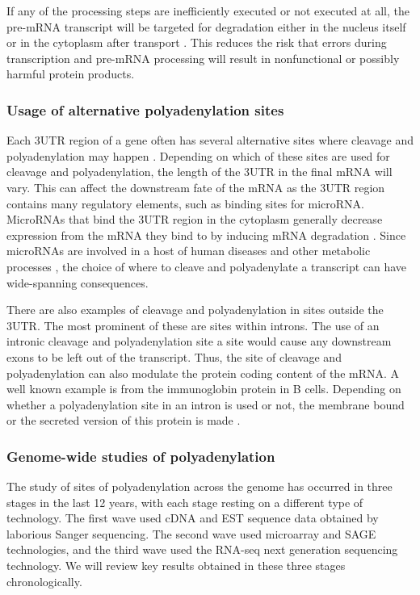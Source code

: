 If any of the processing steps are inefficiently executed or not executed at
all, the pre-mRNA transcript will be targeted for degradation either in the
nucleus itself or in the cytoplasm after transport \cite{doma_rna_2007}. This
reduces the risk that errors during transcription and pre-mRNA processing will
result in nonfunctional or possibly harmful protein products.

\subsubsection{Usage of alternative polyadenylation sites}
Each 3\p UTR region of a gene often has several alternative sites where
cleavage and polyadenylation may happen \cite{tian_large-scale_2005}. Depending
on which of these sites are used for cleavage and polyadenylation, the length
of the 3\p UTR in the final mRNA will vary. This can affect the downstream fate
of the mRNA as the 3\p UTR region contains many regulatory elements, such as
binding sites for microRNA. MicroRNAs that bind the 3\p UTR region in the
cytoplasm generally decrease expression from the mRNA they bind to by inducing
mRNA degradation \cite{huntzinger_gene_2011}. Since microRNAs are involved in a
host of human diseases and other metabolic processes
\cite{huang_biological_2010}, the choice of where to cleave and polyadenylate a
transcript can have wide-spanning consequences.

There are also examples of cleavage and polyadenylation in sites outside the
3\p UTR. The most prominent of these are sites within introns. The use of an
intronic cleavage and polyadenylation site a site would cause any downstream
exons to be left out of the transcript. Thus, the site of cleavage and
polyadenylation can also modulate the protein coding content of the mRNA. A
well known example is from the immunoglobin protein in B cells. Depending on
whether a polyadenylation site in an intron is used or not, the membrane bound
or the secreted version of this protein is made \cite{peterson_regulated_1989}.

\subsubsection{Genome-wide studies of polyadenylation}
The study of sites of polyadenylation across the genome has occurred in three
stages in the last 12 years, with each stage resting on a different type of
technology. The first wave used cDNA and EST sequence data obtained by
laborious Sanger sequencing. The second wave used microarray and SAGE
technologies, and the third wave used the RNA-seq next generation sequencing
technology. We will review key results obtained in these three stages
chronologically.

